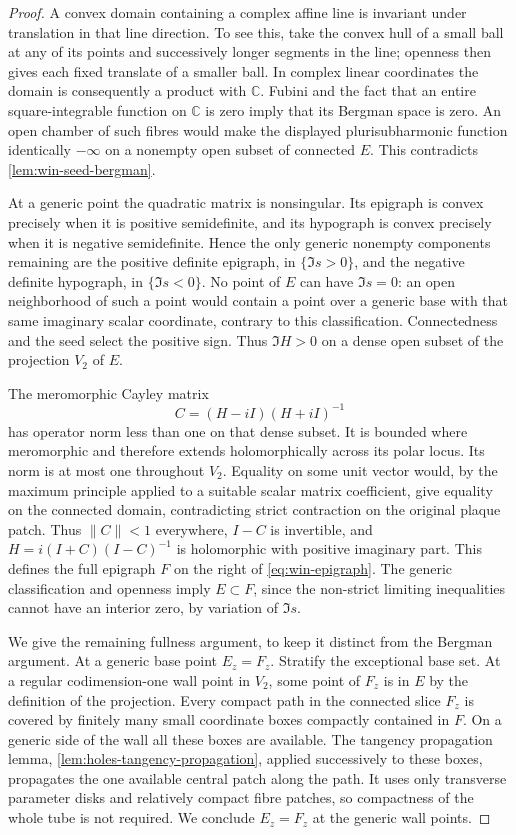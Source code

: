 \begin{proof}
A convex domain containing a complex affine line is invariant under translation in that line direction.  To see this, take the convex hull of a small ball at any of its points and successively longer segments in the line; openness then gives each fixed translate of a smaller ball.  In complex linear coordinates the domain is consequently a product with $\mathbb{C}$.  Fubini and the fact that an entire square-integrable function on $\mathbb{C}$ is zero imply that its Bergman space is zero. An open chamber of such fibres would make the displayed plurisubharmonic function identically $-\infty$ on a nonempty open subset of connected $E$.  This contradicts \cref{lem:win-seed-bergman}.

At a generic point the quadratic matrix is nonsingular.  Its epigraph is convex precisely when it is positive semidefinite, and its hypograph is convex precisely when it is negative semidefinite.  Hence the only generic nonempty components remaining are the positive definite epigraph, in $\{\Im s>0\}$, and the negative definite hypograph, in $\{\Im s<0\}$.  No point of $E$ can have $\Im s=0$: an open neighborhood of such a point would contain a point over a generic base with that same imaginary scalar coordinate, contrary to this classification.  Connectedness and the seed select the positive sign. Thus $\Im H>0$ on a dense open subset of the projection $V_2$ of $E$.

The meromorphic Cayley matrix
\[
                    C=(H-iI)(H+iI)^{-1}
\]
has operator norm less than one on that dense subset.  It is bounded where meromorphic and therefore extends holomorphically across its polar locus.  Its norm is at most one throughout $V_2$.  Equality on some unit vector would, by the maximum principle applied to a suitable scalar matrix coefficient, give equality on the connected domain, contradicting strict contraction on the original plaque patch.  Thus $\|C\|<1$ everywhere, $I-C$ is invertible, and $H=i(I+C)(I-C)^{-1}$ is holomorphic with positive imaginary part. This defines the full epigraph $F$ on the right of \eqref{eq:win-epigraph}.  The generic classification and openness imply $E\subset F$, since the non-strict limiting inequalities cannot have an interior zero, by variation of $\Im s$.

We give the remaining fullness argument, to keep it distinct from the Bergman argument.  At a generic base point $E_z=F_z$.  Stratify the exceptional base set.  At a regular codimension-one wall point in $V_2$, some point of $F_z$ is in $E$ by the definition of the projection. Every compact path in the connected slice $F_z$ is covered by finitely many small coordinate boxes compactly contained in $F$.  On a generic side of the wall all these boxes are available.  The tangency propagation lemma, \cref{lem:holes-tangency-propagation}, applied successively to these boxes, propagates the one available central patch along the path.  It uses only transverse parameter disks and relatively compact fibre patches, so compactness of the whole tube is not required.  We conclude $E_z=F_z$ at the generic wall points.


\end{proof}
